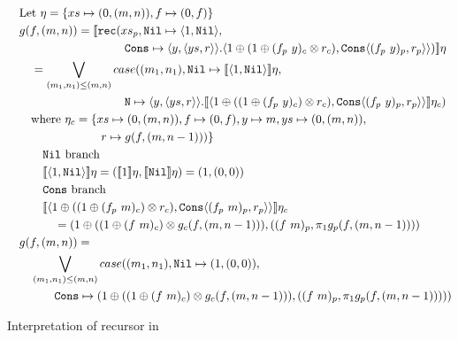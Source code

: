 \begin{figure}
  \label{fig:ws_map_interpretation}
  \caption{Interpretation of recursor in }
  \[\begin{split}
      &\quad \text{Let } \eta = \{ xs \mapsto (0, (m, n)), f \mapsto (0, f)\}\\
      &\quad g(f, (m, n)) = \llbracket \texttt{rec}(xs_p, \texttt{Nil} \mapsto \langle 1, \texttt{Nil}\rangle,\\
      &\qquad\quad\quad\quad\qquad\quad\quad\quad \texttt{Cons} \mapsto \langle y, \langle ys, r \rangle \rangle . \langle 1 \oplus (1 \oplus (f_p\ y)_c \otimes r_c), \texttt{Cons}\langle (f_p\ y)_p, r_p\rangle\rangle) \rrbracket \eta\\
      &\qquad = \bigvee\limits_{(m_1, n_1) \leq (m, n)} case((m_1, n_1), \texttt{Nil} \mapsto \llbracket \langle 1, \texttt{Nil} \rangle \rrbracket \eta, \\
      &\qquad\quad\quad\quad\qquad\quad\quad\quad \texttt{N} \mapsto \langle y, \langle ys, r \rangle \rangle . \llbracket \langle 1 \oplus ((1 \oplus (f_p\ y)_c) \otimes r_c), \texttt{Cons} \langle (f_p\ y)_p, r_p \rangle \rangle \rrbracket \eta_c) \\
      &\qquad \text{where } \eta_c = \{xs \mapsto (0, (m, n)), f \mapsto (0, f), y \mapsto m, ys \mapsto (0, (m, n)), \\
      &\qquad\quad\quad\quad\quad\quad\quad r \mapsto g(f, (m, n-1)))\} \\
      &\qquad\quad \text{\texttt{Nil} branch} \\
      &\qquad\quad \llbracket \langle 1, \texttt{Nil} \rangle \rrbracket \eta = (\llbracket 1 \rrbracket \eta , \llbracket \texttt{Nil} \rrbracket \eta) = (1, (0, 0)) \\
      &\qquad\quad \text{\texttt{Cons} branch} \\
      &\qquad\quad  \llbracket \langle 1 \oplus ((1 \oplus (f_p\ m)_c) \otimes r_c), \texttt{Cons} \langle (f_p\ m)_p, r_p \rangle \rangle \rrbracket \eta_c \\
      &\qquad\quad\quad = (1 \oplus ((1 \oplus (f\ m)_c) \otimes g_c(f, (m, n-1))), ((f\ m)_p, \pi_1 g_p(f, (m, n-1)))) \\
      &\quad g(f, (m, n)) = \\
      &\qquad \bigvee\limits_{(m_1, n_1) \leq (m, n)} case((m_1, n_1), \texttt{Nil} \mapsto (1, (0, 0)), \\
      &\qquad\quad\quad \texttt{Cons} \mapsto (1 \oplus ((1 \oplus (f\ m)_c) \otimes g_c(f, (m, n-1))), ((f\ m)_p, \pi_1 g_p(f, (m, n-1)))))
  \end{split}\]
\end{figure}
